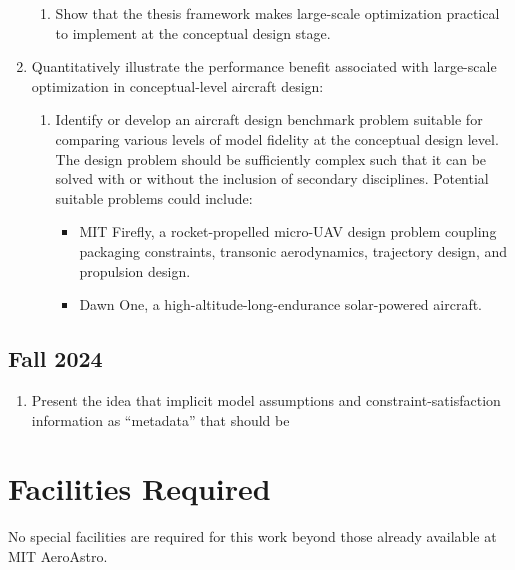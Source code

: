 \documentclass[12pt,vi,oneside]{report}
\begin{document}
\begin{enumerate}
\begin{enumerate}
            \item Show that the thesis framework makes large-scale optimization practical to implement at the conceptual design stage.
        \end{enumerate}
        \item Quantitatively illustrate the performance benefit associated with large-scale optimization in conceptual-level aircraft design:
        \begin{enumerate}
            \item Identify or develop an aircraft design benchmark problem suitable for comparing various levels of model fidelity at the conceptual design level. The design problem should be sufficiently complex such that it can be solved with or without the inclusion of secondary disciplines. Potential suitable problems could include:
            \begin{itemize}[nolistsep]
                \item MIT Firefly, a rocket-propelled micro-UAV design problem coupling packaging constraints, transonic aerodynamics, trajectory design, and propulsion design.
                \item Dawn One, a high-altitude-long-endurance solar-powered aircraft.
            \end{itemize}
        \end{enumerate}
    \end{enumerate}

    \subsection*{Fall 2024}

    \begin{enumerate}
        \item Present the idea that implicit model assumptions and constraint-satisfaction information as ``metadata'' that should be %
    \end{enumerate}



    \section{Facilities Required}
    \label{sec:facilities}

    No special facilities are required for this work beyond those already available at MIT AeroAstro.
\end{document}
